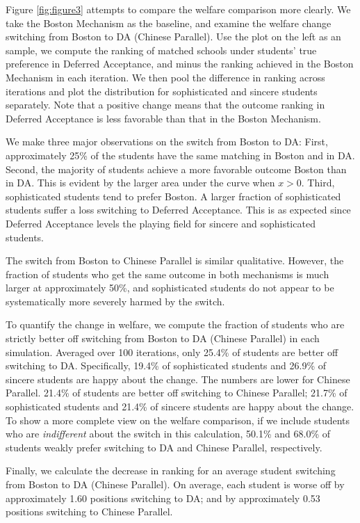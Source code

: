 \documentclass[10pt, reqno]{amsart}
\begin{document}
Figure \ref{fig:figure3} attempts to compare the welfare comparison more clearly. We take the Boston Mechanism as the baseline, and examine the welfare change switching from Boston to DA (Chinese Parallel).
Use the plot on the left as an sample, we compute the ranking of matched schools under students' true preference in Deferred Acceptance, and minus the ranking achieved in the Boston Mechanism in each iteration. We then pool the difference in ranking across iterations and plot the distribution for sophisticated and sincere students separately. Note that a positive change means that the outcome ranking in Deferred Acceptance is less favorable than that in the Boston Mechanism. 

We make three major observations on the switch from Boston to DA:
First, approximately 25\% of the students have the same matching in Boston and in DA. 
Second, the majority of students achieve a more favorable outcome Boston than in DA. This is evident by the larger area under the curve  when $x > 0$. 
Third, sophisticated students tend to prefer Boston. A larger fraction of sophisticated students suffer a loss switching to Deferred Acceptance. This is as expected since Deferred Acceptance levels the playing field for sincere and sophisticated students. 

The switch from Boston to Chinese Parallel is similar qualitative. However, the fraction of students who get the same outcome in both mechanisms is much larger at approximately 50\%, and sophisticated students do not appear to be systematically more severely harmed by the switch. 

To quantify the change in welfare, we compute the fraction of students who are strictly better off switching from Boston to DA (Chinese Parallel) in each simulation. Averaged over 100 iterations, only 25.4\% of students are better off switching to DA. Specifically, 19.4\% of sophisticated students and 26.9\% of sincere students are happy about the change. The numbers are lower for Chinese Parallel. 21.4\% of students are better off switching to Chinese Parallel; 21.7\% of sophisticated students and 21.4\% of sincere students are happy about the change. To show a more complete view on the welfare comparison, if we include students who are \textit{indifferent} about the switch in this calculation, 50.1\% and 68.0\% of students weakly prefer switching to DA and Chinese Parallel, respectively. 

Finally, we calculate the decrease in ranking for an average student switching from Boston to DA (Chinese Parallel). On average, each student is worse off by approximately 1.60 positions switching to DA; and by approximately 0.53 positions switching to Chinese Parallel.
\end{document}
